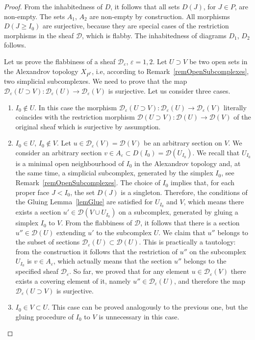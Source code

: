 \documentclass[english,12pt,oneside]{amsproc}
\newcommand{\ca}[1]{\mathcal{#1}}
\numberwithin{equation}{section}
\theoremstyle{plain}
\theoremstyle{definition}
\theoremstyle{remark}
\begin{document}
\begin{proof}
From the inhabitedness of $D$, it follows that all sets $D(J)$, for $J\in P$, are non-empty. The sets $A_1$, $A_2$ are non-empty by construction. All morphisms $D(J\geqslant I_0)$ are surjective, because they are special cases of the restriction morphisms in the sheaf $\ca{D}$, which is flabby. The inhabitedness of diagrams $D_1$, $D_2$ follows.

Let us prove the flabbiness of a sheaf $\ca{D}_\varepsilon$, $\varepsilon=1,2$. Let $U\supset V$ be two open sets in the Alexandrov topology $X_{P^*}$, i.e, according to Remark~\ref{remOpenSubcomplexes}, two simplicial subcomplexes. We need to prove that the map $\ca{D}_\varepsilon(U\supset V)\colon \ca{D}_\varepsilon(U)\to \ca{D}_\varepsilon(V)$ is surjective. Let us consider three cases.
\begin{enumerate}
  \item $I_0\notin U$. In this case the morphism $\ca{D}_\varepsilon(U\supset V)\colon \ca{D}_\varepsilon(U)\to \ca{D}_\varepsilon(V)$ literally coincides with the restriction morphism $\ca{D}(U\supset V)\colon \ca{D}(U)\to \ca{D}(V)$ of the original sheaf which is surjective by assumption.
  \item $I_0\in U$, $I_0\notin V$. Let $u\in \ca{D}_\varepsilon(V)=\ca{D}(V)$ be an arbitrary section on $V$. We consider an arbitrary section $v\in A_\varepsilon\subset D(I_0)=\ca{D}(U_{I_0})$. We recall that $U_{I_0}$ is a minimal open neighbourhood of $I_0$ in the Alexandrov topology and, at the same time, a simplicial subcomplex, generated by the simplex $I_0$, see Remark~\ref{remOpenSubcomplexes}. The choice of $I_0$ implies that, for each proper face $J<I_0$, the set $D(J)$ is a singleton. Therefore, the conditions of the Gluing Lemma~\ref{lemGlue} are satisfied for $U_{I_0}$ and $V$, which means there exists a section $u'\in \ca{D}(V\cup U_{I_0})$ on a subcomplex, generated by gluing a simplex $I_0$ to $V$. From the flabbiness of $\ca{D}$, it follows that there is a section $u''\in \ca{D}(U)$ extending $u'$ to the subcomplex $U$. We claim that $u''$ belongs to the subset of sections $\ca{D}_\varepsilon(U)\subset \ca{D}(U)$. This is practically a tautology: from the construction it follows that the restriction of $u''$ on the subcomplex $U_{I_0}$ is $v\in A_\varepsilon$, which actually means that the section $u''$ belongs to the specified sheaf $\ca{D}_\varepsilon$. So far, we proved that for any element $u\in \ca{D}_\varepsilon(V)$ there exists a covering element of it, namely $u''\in\ca{D}_\varepsilon(U)$, and therefore the map $\ca{D}_\varepsilon(U\supset V)$ is surjective.
  \item $I_0\in V\subset U$. This case can be proved analogously to the previous one, but the gluing procedure of $I_0$ to $V$ is unnecessary in this case.
\end{enumerate}
\end{proof}
\end{document}
